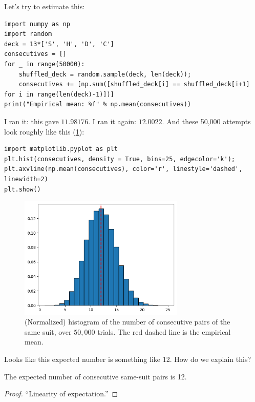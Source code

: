 Let's try to estimate this:
\begin{lstlisting}
import numpy as np
import random
deck = 13*['S', 'H', 'D', 'C']
consecutives = []
for _ in range(50000):
    shuffled_deck = random.sample(deck, len(deck));
    consecutives += [np.sum([shuffled_deck[i] == shuffled_deck[i+1] for i in range(len(deck)-1)])]
print("Empirical mean: %f" % np.mean(consecutives))
\end{lstlisting}
I ran it: this gave $11.98176$. I ran it again: $12.0022$. And these 50,000 attempts look roughly like this (\cref{fig:consecutives}):
\begin{lstlisting}
import matplotlib.pyplot as plt
plt.hist(consecutives, density = True, bins=25, edgecolor='k');
plt.axvline(np.mean(consecutives), color='r', linestyle='dashed', linewidth=2)
plt.show()
\end{lstlisting}
\begin{figure}[htbp]\centering
    \label{fig:consecutives}
\includegraphics[width=0.7\textwidth]{figures/fig-consecutives-shuffled.png}
\caption{(Normalized) histogram of the number of consecutive pairs of the same suit, over $50,000$ trials. The red dashed line is the empirical mean.}
\end{figure}
Looks like this expected number is something like 12. How do we explain this?

\begin{theorem}
    The expected number of consecutive same-suit pairs is 12.
\end{theorem}
\begin{proof}
    ``Linearity of expectation.''
\end{proof}

